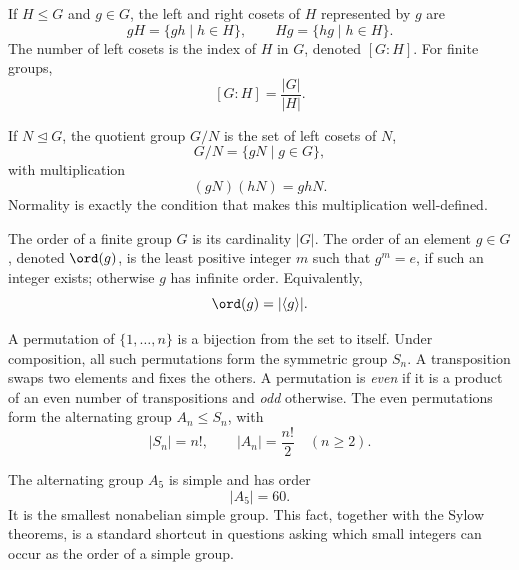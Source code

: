     \begin{definition}
        If $H\leq G$ and $g\in G$, the left and right cosets of $H$ represented
        by $g$ are
        \[
            gH=\{gh\mid h\in H\},
            \qquad
            Hg=\{hg\mid h\in H\}.
        \]
        The number of left cosets is the index of $H$ in $G$, denoted
        $[G:H]$. For finite groups,
        \[
            [G:H]=\frac{|G|}{|H|}.
        \]
    \end{definition}

    \begin{definition}
        If $N\trianglelefteq G$, the quotient group $G/N$ is the set of
        left cosets of $N$,
        \[
            G/N=\{gN\mid g\in G\},
        \]
        with multiplication
        \[
            (gN)(hN)=ghN.
        \]
        Normality is exactly the condition that makes this multiplication
        well-defined.
    \end{definition}

    \begin{definition}
        The order of a finite group $G$ is its cardinality $|G|$. The order of
        an element $g\in G$, denoted $\ord(g)$, is the least positive integer
        $m$ such that $g^m=e$, if such an integer exists; otherwise $g$ has infinite
        order. Equivalently,
        \[
            \ord(g)=|\langle g\rangle|.
        \]
    \end{definition}

    \begin{definition}
        A permutation of $\{1,\dots,n\}$ is a bijection from the set to itself.
        Under composition, all such permutations form the symmetric group $S_n$.
        A transposition swaps two elements and fixes the others. A permutation is
        \emph{even} if it is a product of an even number of transpositions and
        \emph{odd} otherwise. The even permutations form the alternating group
        $A_n\leq S_n$, with
        \[
            |S_n|=n!,
            \qquad
            |A_n|=\frac{n!}{2}
            \quad(n\geq2).
        \]
    \end{definition}

    \begin{fact}
        The alternating group $A_5$ is simple and has order
        \[
            |A_5|=60.
        \]
        It is the smallest nonabelian simple group. This fact, together with the
        Sylow theorems, is a standard shortcut in questions asking which small
        integers can occur as the order of a simple group.
    \end{fact}

